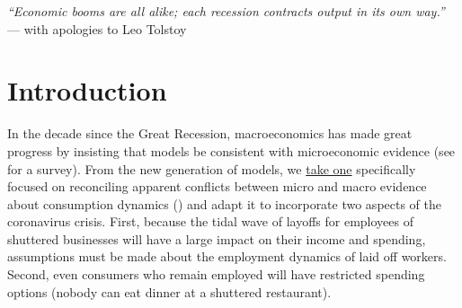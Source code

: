 \documentclass[titlepage,a4paper]{\econtex}
\begin{document}

\setcounter{page}{1}

\titlepagefinish\newpage\pagestyle{empty}



\noindent \textit{\large ``Economic booms are all alike; each recession contracts output in its own way.''} \\ \indent --- with apologies to Leo Tolstoy

\section{Introduction}


In the decade since the Great Recession, macroeconomics has made great progress by insisting that models be consistent with microeconomic evidence (see \cite{kmpHandbook} for a survey).  From the new generation of models, we \href{https://econ.jhu.edu/people/ccarroll/papers/cAndCwithSTickyE}{take one} specifically focused on reconciling apparent conflicts between micro and macro evidence about consumption dynamics (\cite{hrsHabit}) and adapt it to incorporate two aspects of the coronavirus crisis. First, because the tidal wave of layoffs for employees of shuttered businesses will have a large impact on their income and spending, assumptions must be made about the employment dynamics of laid off workers.  Second, even consumers who remain employed will have restricted spending options (nobody can eat dinner at a shuttered restaurant).
\end{document}
